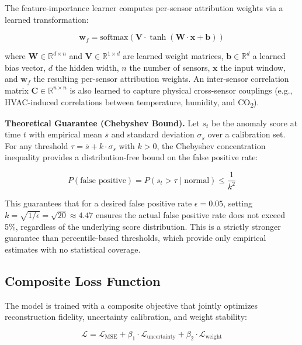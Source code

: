 The feature-importance learner computes per-sensor attribution weights via a learned transformation:

\begin{equation}
\mathbf{w}_f = \text{softmax}\left(\mathbf{V} \cdot \tanh(\mathbf{W} \cdot \mathbf{x} + \mathbf{b})\right)
\label{eq:feature_importance}
\end{equation}

where $\mathbf{W} \in \mathbb{R}^{d \times n}$ and $\mathbf{V} \in \mathbb{R}^{1 \times d}$ are learned weight matrices, $\mathbf{b} \in \mathbb{R}^{d}$ a learned bias vector, $d$ the hidden width, $n$ the number of sensors, $\mathbf{x}$ the input window, and $\mathbf{w}_f$ the resulting per-sensor attribution weights. An inter-sensor correlation matrix $\mathbf{C} \in \mathbb{R}^{n \times n}$ is also learned to capture physical cross-sensor couplings (e.g., HVAC-induced correlations between temperature, humidity, and CO\textsubscript{2}).

\textbf{Theoretical Guarantee (Chebyshev Bound).} Let $s_t$ be the anomaly score at time $t$ with empirical mean $\bar{s}$ and standard deviation $\sigma_s$ over a calibration set. For any threshold $\tau = \bar{s} + k \cdot \sigma_s$ with $k > 0$, the Chebyshev concentration inequality provides a distribution-free bound on the false positive rate:

\begin{equation}
P(\text{false positive}) = P(s_t > \tau \mid \text{normal}) \leq \frac{1}{k^2}
\label{eq:chebyshev}
\end{equation}

This guarantees that for a desired false positive rate $\epsilon = 0.05$, setting $k = \sqrt{1/\epsilon} = \sqrt{20} \approx 4.47$ ensures the actual false positive rate does not exceed 5\%, regardless of the underlying score distribution. This is a strictly stronger guarantee than percentile-based thresholds, which provide only empirical estimates with no statistical coverage.

\subsection{Composite Loss Function}

The model is trained with a composite objective that jointly optimizes reconstruction fidelity, uncertainty calibration, and weight stability:

\begin{equation}
\mathcal{L} = \mathcal{L}_{\text{MSE}} + \beta_1 \cdot \mathcal{L}_{\text{uncertainty}} + \beta_2 \cdot \mathcal{L}_{\text{weight}}
\label{eq:loss}
\end{equation}

